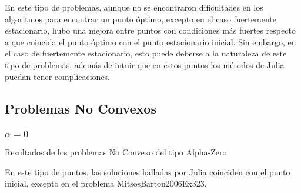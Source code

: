 En este tipo de problemas, aunque no se encontraron dificultades en los algoritmos para encontrar un punto óptimo, excepto en el caso fuertemente estacionario, 
hubo una mejora entre puntos con condiciones más fuertes respecto a que coincida el punto óptimo con el punto estacionario inicial. 
Sin embargo, en el caso de fuertemente estacionario, esto puede deberse a la naturaleza de este tipo de problemas, 
además de intuir que en estos puntos los métodos de Julia puedan tener complicaciones.

\subsection{Problemas No Convexos}


    
\subsubsection{$\alpha =0$}
    \begin{resultstablee}{Resultados de los problemas No Convexo del tipo Alpha-Zero}
    
 \hline  
 \hline  
 \hline  
 \hline  
 \hline  
 
    
    
 \end{resultstablee} 
 En este tipo de puntos, las soluciones halladas por Julia coinciden con el punto inicial, excepto en el problema MitsosBarton2006Ex323.
    

